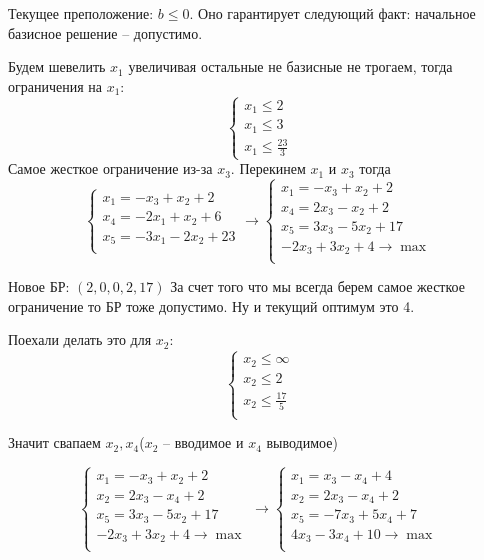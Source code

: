 Текущее преположение: $b \leq 0$. Оно гарантирует следующий факт: начальное базисное решение -- допустимо.

Будем шевелить $x_1$ увеличивая остальные не базисные не трогаем, тогда ограничения на $x_1$:
\[
    \begin{cases}
        x_1 \leq 2\\
        x_1 \leq 3\\
        x_1 \leq \frac{23}{3}
    \end{cases}
\]
Самое жесткое ограничение из-за $x_3$. Перекинем $x_1$ и $x_3$ тогда
\[
    \begin{cases}
        x_1 = -x_3 + x_2 + 2\\
        x_4 = -2x_1 + x_2 + 6\\
        x_5 = -3x_1 - 2x_2 + 23\\
    \end{cases}  \to
    \begin{cases}
        x_1 = -x_3 + x_2 + 2\\
        x_4 = 2x_3 - x_2 + 2\\
        x_5 = 3x_3 - 5x_2 + 17\\
        -2x_3 + 3 x_2 + 4 \to \max\\
    \end{cases}
\]

Новое БР: $\left(2, 0, 0, 2, 17\right)$
За счет того что мы всегда берем самое жесткое ограничение то БР тоже допустимо.
Ну и текущий оптимум это 4.

Поехали делать это для $x_2$:
\[
    \begin{cases}
        x_2 \leq \infty\\
        x_2 \leq 2\\
        x_2 \leq \frac{17}{5}\\
    \end{cases}
\]

Значит свапаем $x_2, x_4$($x_2$ -- вводимое и $x_4$ выводимое)

\[
    \begin{cases}
        x_1 = -x_3 + x_2 + 2\\
        x_2 = 2x_3 - x_4 + 2\\
        x_5 = 3x_3 - 5x_2 + 17\\
        -2x_3 + 3 x_2 + 4 \to \max\\
    \end{cases} \to
    \begin{cases}
        x_1 = x_3 - x_4 + 4\\
        x_2 = 2x_3 - x_4 + 2\\
        x_5 = -7x_3 + 5x_4 + 7\\
        4x_3 - 3 x_4 + 10 \to \max\\
    \end{cases}
\]

